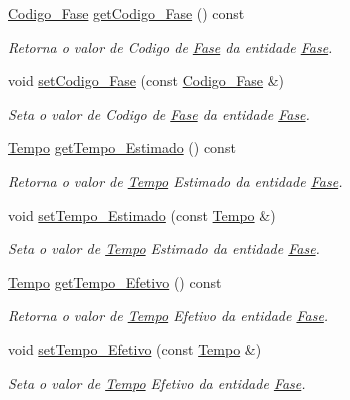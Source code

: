 \begin{DoxyCompactItemize}
\item 
\hyperlink{class_codigo___fase}{\-Codigo\-\_\-\-Fase} \hyperlink{class_fase_a602d9dcd3d2cc62a38815cc92bb2544e}{get\-Codigo\-\_\-\-Fase} () const 
\begin{DoxyCompactList}\small\item\em \-Retorna o valor de \-Codigo de \hyperlink{class_fase}{\-Fase} da entidade \hyperlink{class_fase}{\-Fase}. \end{DoxyCompactList}\item 
void \hyperlink{class_fase_a8558fc7a14dedece24cb05ef45a468ed}{set\-Codigo\-\_\-\-Fase} (const \hyperlink{class_codigo___fase}{\-Codigo\-\_\-\-Fase} \&)
\begin{DoxyCompactList}\small\item\em \-Seta o valor de \-Codigo de \hyperlink{class_fase}{\-Fase} da entidade \hyperlink{class_fase}{\-Fase}. \end{DoxyCompactList}\item 
\hyperlink{class_tempo}{\-Tempo} \hyperlink{class_fase_a2745e6795ee74841ab2568bd6634677f}{get\-Tempo\-\_\-\-Estimado} () const 
\begin{DoxyCompactList}\small\item\em \-Retorna o valor de \hyperlink{class_tempo}{\-Tempo} \-Estimado da entidade \hyperlink{class_fase}{\-Fase}. \end{DoxyCompactList}\item 
void \hyperlink{class_fase_a03725dee42c6222b00278c1e6b335ab7}{set\-Tempo\-\_\-\-Estimado} (const \hyperlink{class_tempo}{\-Tempo} \&)
\begin{DoxyCompactList}\small\item\em \-Seta o valor de \hyperlink{class_tempo}{\-Tempo} \-Estimado da entidade \hyperlink{class_fase}{\-Fase}. \end{DoxyCompactList}\item 
\hyperlink{class_tempo}{\-Tempo} \hyperlink{class_fase_a19537f118a435b148749fdd965e33e7a}{get\-Tempo\-\_\-\-Efetivo} () const 
\begin{DoxyCompactList}\small\item\em \-Retorna o valor de \hyperlink{class_tempo}{\-Tempo} \-Efetivo da entidade \hyperlink{class_fase}{\-Fase}. \end{DoxyCompactList}\item 
void \hyperlink{class_fase_ad804992aa80bdb68e6414ab2c16f2e70}{set\-Tempo\-\_\-\-Efetivo} (const \hyperlink{class_tempo}{\-Tempo} \&)
\begin{DoxyCompactList}\small\item\em \-Seta o valor de \hyperlink{class_tempo}{\-Tempo} \-Efetivo da entidade \hyperlink{class_fase}{\-Fase}. \end{DoxyCompactList}\end{DoxyCompactItemize}


